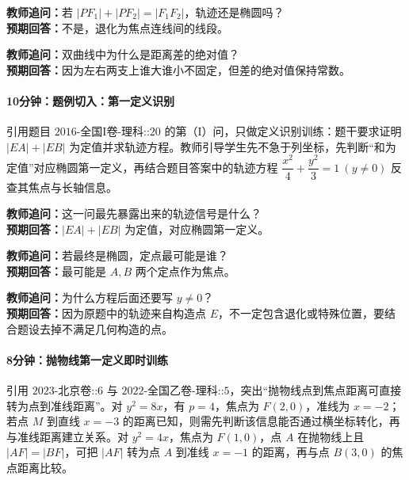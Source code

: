 \documentclass[UTF8,a4paper,11pt]{ctexart}
\begin{document}
\noindent\textbf{教师追问：}若 $|PF_1|+|PF_2|=|F_1F_2|$，轨迹还是椭圆吗？\\

\textbf{预期回答：}不是，退化为焦点连线间的线段。\par

\noindent\textbf{教师追问：}双曲线中为什么是距离差的绝对值？\\

\textbf{预期回答：}因为左右两支上谁大谁小不固定，但差的绝对值保持常数。\par

\paragraph{10分钟：题例切入：第一定义识别}

引用题目 $\text{2016-全国I卷-理科::20}$ 的第（I）问，只做定义识别训练：题干要求证明 $|EA|+|EB|$ 为定值并求轨迹方程。教师引导学生先不急于列坐标，先判断“和为定值”对应椭圆第一定义，再结合题目答案中的轨迹方程 $\dfrac{x^2}{4}+\dfrac{y^2}{3}=1\ (y\ne 0)$ 反查其焦点与长轴信息。

\noindent\textbf{教师追问：}这一问最先暴露出来的轨迹信号是什么？\\

\textbf{预期回答：}$|EA|+|EB|$ 为定值，对应椭圆第一定义。\par

\noindent\textbf{教师追问：}若最终是椭圆，定点最可能是谁？\\

\textbf{预期回答：}最可能是 $A,B$ 两个定点作为焦点。\par

\noindent\textbf{教师追问：}为什么方程后面还要写 $y\ne 0$？\\

\textbf{预期回答：}因为原题中的轨迹来自构造点 $E$，不一定包含退化或特殊位置，要结合题设去掉不满足几何构造的点。\par

\paragraph{8分钟：抛物线第一定义即时训练}

引用 $\text{2023-北京卷::6}$ 与 $\text{2022-全国乙卷-理科::5}$，突出“抛物线点到焦点距离可直接转为点到准线距离”。对 $y^2=8x$，有 $p=4$，焦点为 $F(2,0)$，准线为 $x=-2$；若点 $M$ 到直线 $x=-3$ 的距离已知，则需先判断该信息能否通过横坐标转化，再与准线距离建立关系。对 $y^2=4x$，焦点为 $F(1,0)$，点 $A$ 在抛物线上且 $|AF|=|BF|$，可把 $|AF|$ 转为点 $A$ 到准线 $x=-1$ 的距离，再与点 $B(3,0)$ 的焦点距离比较。
\end{document}
